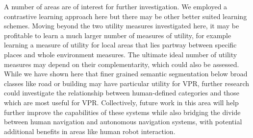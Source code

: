 \documentclass[letterpaper, 10 pt, conference]{ieeeconf}  \fi
\begin{document}
A number of areas are of interest for further investigation. We employed a contrastive learning approach here but there may be other better suited learning schemes. Moving beyond the two utility measures investigated here, it may be profitable to learn a much larger number of measures of utility, for example learning a measure of utility for local areas that lies partway between specific places and whole environment measures. The ultimate ideal number of utility measures may depend on their complementarity, which could also be assessed. While we have shown here that finer grained semantic segmentation below broad classes like road or building may have particular utility for VPR, further research could investigate the relationship between human-defined categories and those which are most useful for VPR. Collectively, future work in this area will help further improve the capabilities of these systems while also bridging the divide between human navigation and autonomous navigation systems, with potential additional benefits in areas like human robot interaction.






\end{document}
